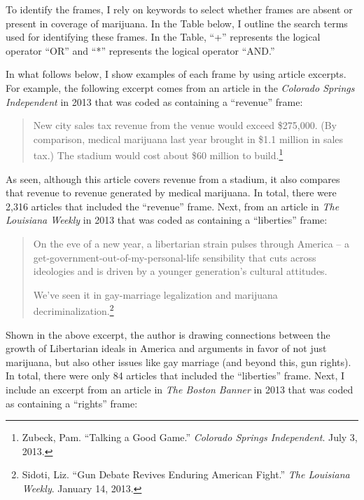 To identify the frames, I rely on keywords to select whether frames are absent or present in coverage of marijuana. In the Table below, I outline the search terms used for identifying these frames. In the Table, ``+'' represents the logical operator ``OR'' and ``*'' represents the logical operator ``AND.''



In what follows below, I show examples of each frame by using article excerpts. For example, the following excerpt comes from an article in the \textit{Colorado Springs Independent} in 2013 that was coded as containing a ``revenue'' frame:

\begin{quotation}
\begin{singlespace}
\noindent New city sales tax revenue from the venue would exceed \$275,000. (By comparison, medical marijuana last year brought in \$1.1 million in sales tax.) The stadium would cost about \$60 million to build.\footnote{Zubeck, Pam. ``Talking a Good Game.'' \textit{Colorado Springs Independent}. July 3, 2013.}
\end{singlespace}
\end{quotation}

As seen, although this article covers revenue from a stadium, it also compares that revenue to revenue generated by medical marijuana. In total, there were 2,316 articles that included the ``revenue'' frame. Next, from an article in \textit{The Louisiana Weekly} in 2013 that was coded as containing a ``liberties'' frame:

\begin{quotation}
\begin{singlespace}
\noindent On the eve of a new year, a libertarian strain pulses through America -- a get-government-out-of-my-personal-life sensibility that cuts across ideologies and is driven by a younger generation's cultural attitudes.\newline

\noindent We've seen it in gay-marriage legalization and marijuana decriminalization.\footnote{Sidoti, Liz. ``Gun Debate Revives Enduring American Fight.'' \textit{The Louisiana Weekly}. January 14, 2013.}
\end{singlespace}
\end{quotation}

Shown in the above excerpt, the author is drawing connections between the growth of Libertarian ideals in America and arguments in favor of not just marijuana, but also other issues like gay marriage (and beyond this, gun rights). In total, there were only 84 articles that included the ``liberties'' frame. Next, I include an excerpt from an article in \textit{The Boston Banner} in 2013 that was coded as containing a ``rights'' frame:

